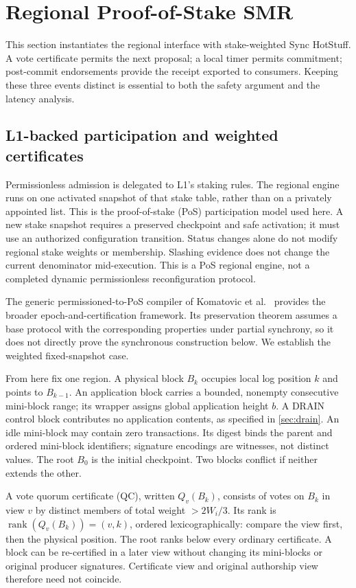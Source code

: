\documentclass[11pt,a4paper,onecolumn]{article}
\newcommand{\rank}{\operatorname{rank}}
\newcounter{protocol}
\begin{document}
\section{Regional Proof-of-Stake SMR}\label{sec:protocol}
This section instantiates the regional interface with stake-weighted Sync
HotStuff. A vote certificate permits the next proposal; a local timer
permits commitment; post-commit endorsements provide the receipt exported
to consumers. Keeping these three events distinct is essential to both
the safety argument and the latency analysis.

\subsection{L1-backed participation and weighted certificates}
Permissionless admission is delegated to L1's staking rules. The regional
engine runs on one activated snapshot of that stake table, rather than on a
privately appointed list. This is the proof-of-stake (PoS) participation
model used here. A new stake snapshot requires a preserved checkpoint
and safe activation; it must use an authorized configuration transition.
Status changes alone do not modify regional stake weights or membership. Slashing evidence does not change the current denominator
mid-execution. This is a PoS regional engine, not a completed dynamic
permissionless reconfiguration protocol.

The generic permissioned-to-PoS compiler of Komatovic et al.~\cite{poscompiler}
provides the broader epoch-and-certification framework. Its preservation
theorem assumes a base protocol with the corresponding properties under
partial synchrony, so it does not directly prove the synchronous construction
below. We establish the weighted fixed-snapshot case.

From here fix one region. A physical block $B_k$ occupies local log position
$k$ and points to $B_{k-1}$. An application block carries a bounded, nonempty
consecutive mini-block range; its wrapper assigns global application height
$b$. A DRAIN control block contributes no application contents, as specified
in \cref{sec:drain}. An idle mini-block may contain zero transactions.
Its digest binds the parent and ordered mini-block identifiers;
signature encodings are witnesses, not distinct values. The root $B_0$ is
the initial checkpoint. Two blocks conflict if neither extends the other.

A vote quorum certificate (QC), written $Q_v(B_k)$, consists of votes on
$B_k$ in view $v$ by distinct members of total weight $>2W_i/3$.
Its rank is $\rank(Q_v(B_k))=(v,k)$, ordered lexicographically:
compare the view first, then the physical position. The root ranks below
every ordinary certificate. A block
can be re-certified in a later view without changing its mini-blocks or
original producer signatures. Certificate view and original authorship view
therefore need not coincide.
\end{document}
